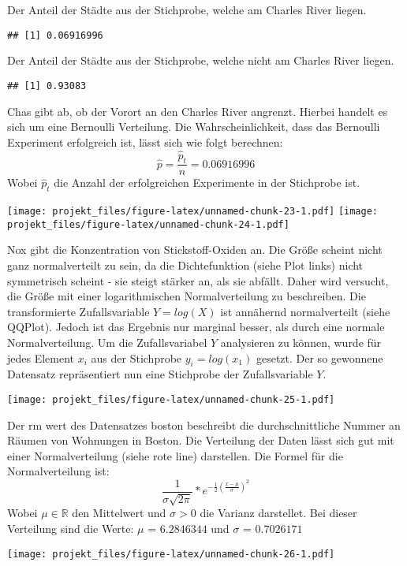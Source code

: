 \documentclass[]{article}
\begin{document}
Der Anteil der Städte aus der Stichprobe, welche am Charles River
liegen.

\begin{verbatim}
## [1] 0.06916996
\end{verbatim}

Der Anteil der Städte aus der Stichprobe, welche nicht am Charles River
liegen.

\begin{verbatim}
## [1] 0.93083
\end{verbatim}

Chas gibt ab, ob der Vorort an den Charles River angrenzt. Hierbei
handelt es sich um eine Bernoulli Verteilung. Die Wahrscheinlichkeit,
dass das Bernoulli Experiment erfolgreich ist, lässt sich wie folgt
berechnen: \[ \hat p = \frac{\hat p_t}{n} = 0.06916996\] Wobei
\(\hat p_t\) die Anzahl der erfolgreichen Experimente in der Stichprobe
ist.

\texttt{[image: projekt\_files/figure-latex/unnamed-chunk-23-1.pdf]}
\texttt{[image: projekt\_files/figure-latex/unnamed-chunk-24-1.pdf]}

Nox gibt die Konzentration von Stickstoff-Oxiden an. Die Größe scheint
nicht ganz normalverteilt zu sein, da die Dichtefunktion (siehe Plot
links) nicht symmetrisch scheint - sie steigt stärker an, als sie
abfällt. Daher wird versucht, die Größe mit einer logarithmischen
Normalverteilung zu beschreiben. Die transformierte Zufallsvariable
\(Y = log(X)\) ist annähernd normalverteilt (siehe QQPlot). Jedoch ist
das Ergebnis nur marginal besser, als durch eine normale
Normalverteilung. Um die Zufallsvariabel \(Y\) analysieren zu können,
wurde für jedes Element \(x_i\) aus der Stichprobe \(y_i = log(x_1)\)
gesetzt. Der so gewonnene Datensatz repräsentiert nun eine Stichprobe
der Zufallsvariable \(Y\).

\texttt{[image: projekt\_files/figure-latex/unnamed-chunk-25-1.pdf]}

Der rm wert des Datensatzes boston beschreibt die durchschnittliche
Nummer an Räumen von Wohnungen in Boston. Die Verteilung der Daten lässt
sich gut mit einer Normalverteilung (siehe rote line) darstellen. Die
Formel für die Normalverteilung ist:
\[\frac{1}{\sigma\sqrt{2\pi}} * e^{-\frac{1}{2}(\frac{x-\mu}{\sigma})^2}\]
Wobei \(\mu \in \mathbb{R}\) den Mittelwert und \(\sigma > 0\) die
Varianz darstellet. Bei dieser Verteilung sind die Werte: \(\mu\) =
\(6.2846344\) und \(\sigma\) = \(0.7026171\)

\texttt{[image: projekt\_files/figure-latex/unnamed-chunk-26-1.pdf]}
\end{document}
